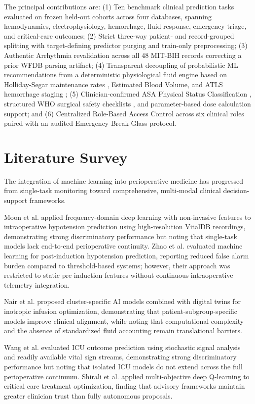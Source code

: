 \documentclass[conference]{IEEEtran}
\begin{document}
The principal contributions are: (1) Ten benchmark clinical prediction tasks evaluated on frozen held-out cohorts across four databases, spanning hemodynamics, electrophysiology, hemorrhage, fluid response, emergency triage, and critical-care outcomes; (2) Strict three-way patient- and record-grouped splitting with target-defining predictor purging and train-only preprocessing; (3) Authentic Arrhythmia revalidation across all 48 MIT-BIH records correcting a prior WFDB parsing artifact; (4) Transparent decoupling of probabilistic ML recommendations from a deterministic physiological fluid engine based on Holliday-Segar maintenance rates \cite{ref14}, Estimated Blood Volume, and ATLS hemorrhage staging \cite{ref17}; (5) Clinician-confirmed ASA Physical Status Classification \cite{ref16}, structured WHO surgical safety checklists \cite{ref18}, and parameter-based dose calculation support; and (6) Centralized Role-Based Access Control across six clinical roles paired with an audited Emergency Break-Glass protocol.

\section{Literature Survey}
The integration of machine learning into perioperative medicine has progressed from single-task monitoring toward comprehensive, multi-modal clinical decision-support frameworks.

Moon et al. \cite{ref1} applied frequency-domain deep learning with non-invasive features to intraoperative hypotension prediction using high-resolution VitalDB recordings, demonstrating strong discriminatory performance but noting that single-task models lack end-to-end perioperative continuity. Zhao et al. \cite{ref5} evaluated machine learning for post-induction hypotension prediction, reporting reduced false alarm burden compared to threshold-based systems; however, their approach was restricted to static pre-induction features without continuous intraoperative telemetry integration.

Nair et al. \cite{ref4} proposed cluster-specific AI models combined with digital twins for inotropic infusion optimization, demonstrating that patient-subgroup-specific models improve clinical alignment, while noting that computational complexity and the absence of standardized fluid accounting remain translational barriers.

Wang et al. \cite{ref12} evaluated ICU outcome prediction using stochastic signal analysis and readily available vital sign streams, demonstrating strong discriminatory performance but noting that isolated ICU models do not extend across the full perioperative continuum. Shirali et al. \cite{ref9} applied multi-objective deep Q-learning to critical care treatment optimization, finding that advisory frameworks maintain greater clinician trust than fully autonomous proposals.
\end{document}
